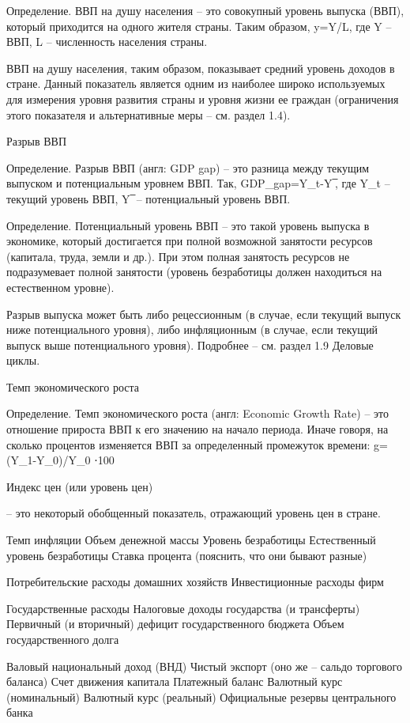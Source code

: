 \documentclass[12pt,a4paper]{article}
\begin{document}
Определение. ВВП на душу населения – это совокупный уровень выпуска (ВВП), который приходится на одного жителя страны. Таким образом, y=Y/L, где Y – ВВП, L – численность населения страны.

ВВП на душу населения, таким образом, показывает средний уровень доходов в стране. Данный показатель является одним из наиболее широко используемых для измерения уровня развития страны и уровня жизни ее граждан (ограничения этого показателя и альтернативные меры – см. раздел 1.4).
 
	Разрыв ВВП

Определение. Разрыв ВВП (англ: GDP gap) – это разница между текущим выпуском и потенциальным уровнем ВВП. Так, GDP_gap=Y_t-Y ̅, где Y_t – текущий уровень ВВП,  Y ̅ – потенциальный уровень ВВП.

Определение. Потенциальный уровень ВВП – это такой уровень выпуска в экономике, который достигается при полной возможной занятости ресурсов (капитала, труда, земли и др.). При этом полная занятость ресурсов не подразумевает полной занятости (уровень безработицы должен находиться на естественном уровне).

Разрыв выпуска может быть либо рецессионным (в случае, если текущий выпуск ниже потенциального уровня), либо инфляционным (в случае, если текущий выпуск выше потенциального уровня). Подробнее – см. раздел 1.9 Деловые циклы.

	Темп экономического роста 

Определение. Темп экономического роста (англ: Economic Growth Rate) – это отношение прироста ВВП к его значению на начало периода. Иначе говоря, на сколько процентов изменяется ВВП за определенный промежуток времени: g=(Y_1-Y_0)/Y_0 ⋅100%

	Индекс цен (или уровень цен) 

– это некоторый обобщенный показатель, отражающий уровень цен в стране. 


	Темп инфляции
	Объем денежной массы
	Уровень безработицы
	Естественный уровень безработицы
	Ставка процента (пояснить, что они бывают разные)

	Потребительские расходы домашних хозяйств 
	Инвестиционные расходы фирм

	Государственные расходы
	Налоговые доходы государства (и трансферты)
	Первичный (и вторичный) дефицит государственного бюджета
	Объем государственного долга

	Валовый национальный доход (ВНД)
	Чистый экспорт (оно же – сальдо торгового баланса)
	Счет движения капитала
	Платежный баланс
	Валютный курс (номинальный)
	Валютный курс (реальный)
	Официальные резервы центрального банка
\end{document}
